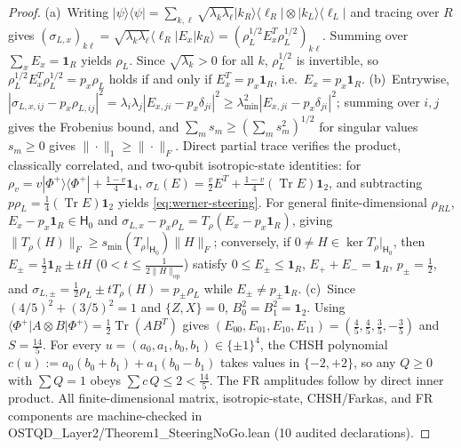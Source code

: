 \documentclass[11pt,a4paper]{article}
\theoremstyle{definition}
\theoremstyle{remark}
\newcommand{\Tr}{\operatorname{Tr}}
\newcommand{\1}{\mathbf{1}}
\newcommand{\normF}[1]{\|#1\|_F}
\newcommand{\normOp}[1]{\|#1\|_{\mathrm{op}}}
\newcommand{\normTr}[1]{\|#1\|_1}
\newcommand{\code}[1]{{\scriptsize\ttfamily #1}}
\begin{document}
\begin{proof}
(a)~Writing $|\psi\rangle\langle\psi|=\sum_{k,\ell}\sqrt{\lambda_k\lambda_\ell}|k_R\rangle\langle\ell_R|\otimes|k_L\rangle\langle\ell_L|$ and tracing over $R$ gives $(\sigma_{L,x})_{k\ell}=\sqrt{\lambda_k\lambda_\ell}\langle\ell_R|E_x|k_R\rangle=(\rho_L^{1/2}E_x^T\rho_L^{1/2})_{k\ell}$. Summing over $\sum_x E_x=\1_R$ yields $\rho_L$. Since $\sqrt{\lambda_k}>0$ for all $k$, $\rho_L^{1/2}$ is invertible, so $\rho_L^{1/2}E_x^T\rho_L^{1/2}=p_x\rho_L$ holds if and only if $E_x^T=p_x\1_R$, i.e.\ $E_x=p_x\1_R$.
(b)~Entrywise, $|\sigma_{L,x,ij}-p_x\rho_{L,ij}|^2 = \lambda_i\lambda_j|E_{x,ji}-p_x\delta_{ji}|^2 \ge \lambda_{\min}^2|E_{x,ji}-p_x\delta_{ji}|^2$; summing over $i,j$ gives the Frobenius bound, and $\sum_m s_m \ge (\sum_m s_m^2)^{1/2}$ for singular values $s_m\ge 0$ gives $\normTr{\cdot}\ge\normF{\cdot}$. Direct partial trace verifies the product, classically correlated, and two-qubit isotropic-state identities: for $\rho_v=v|\Phi^+\rangle\langle\Phi^+|+\frac{1-v}{4}\1_4$, $\sigma_L(E)=\frac{v}{2}E^T+\frac{1-v}{4}(\Tr E)\1_2$, and subtracting $p\rho_L=\frac{1}{4}(\Tr E)\1_2$ yields \eqref{eq:werner-steering}. For general finite-dimensional $\rho_{RL}$, $E_x-p_x\1_R\in\mathsf{H}_0$ and $\sigma_{L,x}-p_x\rho_L=T_\rho(E_x-p_x\1_R)$, giving $\normF{T_\rho(H)}\ge s_{\min}(T_\rho|_{\mathsf{H}_0})\normF{H}$; conversely, if $0\neq H\in\ker T_\rho|_{\mathsf{H}_0}$, then $E_\pm=\frac{1}{2}\1_R\pm t H$ ($0<t\le\frac{1}{2\normOp{H}}$) satisfy $0\le E_\pm\le\1_R$, $E_++E_-=\1_R$, $p_\pm=\frac{1}{2}$, and $\sigma_{L,\pm}=\frac{1}{2}\rho_L\pm t T_\rho(H)=p_\pm\rho_L$ while $E_\pm\neq p_\pm\1_R$.
(c)~Since $(4/5)^2+(3/5)^2=1$ and $\{Z,X\}=0$, $B_0^2=B_1^2=\1_2$. Using $\langle\Phi^+|A\otimes B|\Phi^+\rangle=\frac{1}{2}\Tr(AB^T)$ gives $(E_{00},E_{01},E_{10},E_{11})=(\frac{4}{5},\frac{4}{5},\frac{3}{5},-\frac{3}{5})$ and $S=\frac{14}{5}$. For every $u=(a_0,a_1,b_0,b_1)\in\{\pm 1\}^4$, the CHSH polynomial $c(u):=a_0(b_0+b_1)+a_1(b_0-b_1)$ takes values in $\{-2,+2\}$, so any $Q\ge 0$ with $\sum Q=1$ obeys $\sum c\,Q\le 2 < \frac{14}{5}$. The FR amplitudes follow by direct inner product. All finite-dimensional matrix, isotropic-state, CHSH/Farkas, and FR components are machine-checked in \code{OSTQD\_Layer2/\allowbreak Theorem1\_\allowbreak SteeringNoGo.lean} (10 audited declarations).
\end{proof}
\end{document}
